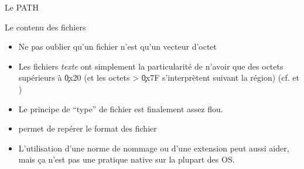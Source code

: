 \begin{frame}[fragile=singleslide]{Le PATH}
\end{frame}

\begin{frame}[fragile=singleslide]{Le contenu des fichiers}
  \begin{itemize}
    \item Ne pas oublier qu'un fichier n'est qu'un vecteur d'octet
    \item Les fichiers \emph{texte} ont simplement la particularité de
      n'avoir que  des octets supérieurs  à \c{0x20} (et les  octets >
      \c{0x7F} s'interprètent  suivant la région)  (cf. 
      et )
    \item Le principe de ``type'' de fichier est finalement assez flou.
    \item {} permet de repérer le format des fichier
    \item L'utilisation d'une norme de nommage ou d'une extension peut
      aussi  aider, mais  ça  n'est  pas une  pratique  native sur  la
      plupart des OS.
    \end{itemize}
\end{frame}

